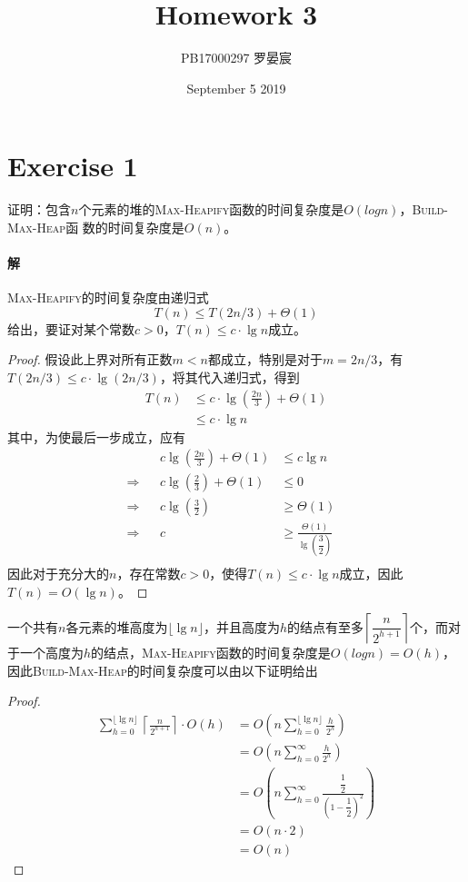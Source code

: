 \documentclass{article}
\title{Homework 3}
\author{PB17000297 罗晏宸}
\date{September 5 2019}
\begin{document}
\maketitle

\section{Exercise 1}
证明：包含$n$个元素的堆的\textsc{Max-Heapify}函数的时间复杂度是$O(logn)$，\textsc{Build-Max-Heap}函
数的时间复杂度是$O(n)$。
\\

\paragraph{解}
\textsc{Max-Heapify}的时间复杂度由递归式
\begin{equation*}
    T(n) \leq T(2n/3) + \Theta(1)
\end{equation*}
给出，要证对某个常数$c > 0$，$T(n) \leq c \cdot \lg{n}$成立。
\begin{proof}
假设此上界对所有正数$m < n$都成立，特别是对于$m =  2n/3$，有$T( 2n/3 ) \leq c \cdot \lg{(2n/3)}$，将其代入递归式，得到
\begin{align*}
    T(n) &\leq c \cdot \lg{\left(\frac{2n}{3}\right)} + \Theta(1) \\
    &\leq c \cdot \lg{n}
\end{align*}
其中，为使最后一步成立，应有
\begin{align*}
    && c \lg{\left(\frac{2n}{3}\right)} + \Theta(1) &\leq c \lg{n}& \\
    \Rightarrow && c \lg{\left( \frac{2}{3} \right)} + \Theta(1) &\leq 0 & \\
    \Rightarrow && c \lg{\left( \frac{3}{2} \right)} &\geq \Theta(1) & \\
    \Rightarrow && c &\geq \frac{\Theta(1)}{\lg{\left( \dfrac{3}{2} \right)}}& \\
\end{align*}
因此对于充分大的$n$，存在常数$c > 0$，使得$T(n) \leq c \cdot \lg{n}$成立，因此$T(n) = O(\lg{n})$。
\end{proof}
一个共有$n$各元素的堆高度为$\lfloor \lg{n} \rfloor$，并且高度为$h$的结点有至多$\left\lceil \dfrac{n}{2^{h+1}} \right\rceil$个，而对于一个高度为$h$的结点，\textsc{Max-Heapify}函数的时间复杂度是$O(logn)=O(h)$，因此\textsc{Build-Max-Heap}的时间复杂度可以由以下证明给出
\begin{proof}
\begin{align*}
    \sum_{h=0}^{\lfloor \lg{n} \rfloor}{\left\lceil \frac{n}{2^{h+1}} \right\rceil \cdot O(h)} &= O\left( n\sum_{h=0}^{\lfloor \lg{n} \rfloor}{\frac{h}{2^h}} \right) \\
    &= O\left( n\sum_{h=0}^{\infty}{\frac{h}{2^h}} \right) \\
    &= O\left( n\sum_{h=0}^{\infty}{\frac{\dfrac{1}{2}}{\left( 1 - \dfrac{1}{2} \right)^2}} \right) \\
    &= O(n \cdot 2) \\
    &= O(n)
\end{align*}
\end{proof}
\end{document}
